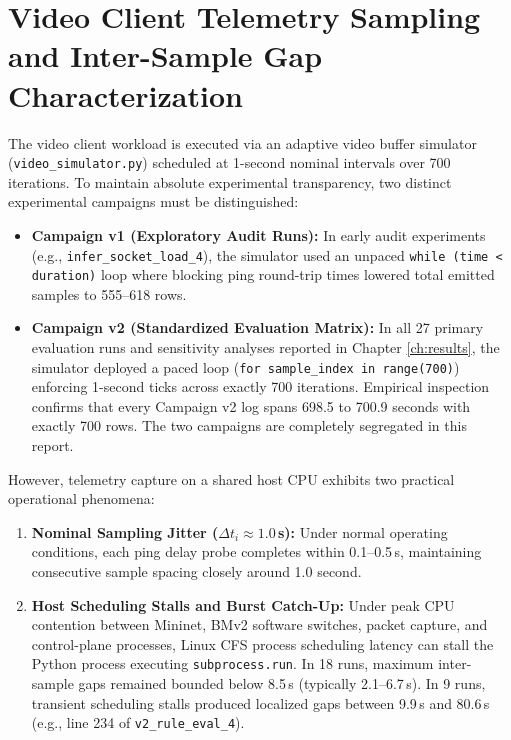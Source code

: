 \documentclass[12pt,a4paper,oneside]{report}
\begin{document}
\section{Video Client Telemetry Sampling and Inter-Sample Gap Characterization}
\label{sec:telemetry_sampling_characterization}
The video client workload is executed via an adaptive video buffer simulator (\texttt{video\_simulator.py}) scheduled at 1-second nominal intervals over 700 iterations. To maintain absolute experimental transparency, two distinct experimental campaigns must be distinguished:
\begin{itemize}
  \item \textbf{Campaign v1 (Exploratory Audit Runs):} In early audit experiments (e.g., \texttt{infer\_socket\_load\_4}), the simulator used an unpaced \texttt{while (time < duration)} loop where blocking ping round-trip times lowered total emitted samples to 555--618 rows.
  \item \textbf{Campaign v2 (Standardized Evaluation Matrix):} In all 27 primary evaluation runs and sensitivity analyses reported in Chapter \ref{ch:results}, the simulator deployed a paced loop (\texttt{for sample\_index in range(700)}) enforcing 1-second ticks across exactly 700 iterations. Empirical inspection confirms that every Campaign v2 log spans 698.5 to 700.9 seconds with exactly 700 rows. The two campaigns are completely segregated in this report.
\end{itemize}

However, telemetry capture on a shared host CPU exhibits two practical operational phenomena:
\begin{enumerate}[label=\arabic*.]
  \item \textbf{Nominal Sampling Jitter ($\Delta t_i \approx 1.0$\,s):} Under normal operating conditions, each ping delay probe completes within 0.1--0.5\,s, maintaining consecutive sample spacing closely around 1.0 second.
  \item \textbf{Host Scheduling Stalls and Burst Catch-Up:} Under peak CPU contention between Mininet, BMv2 software switches, packet capture, and control-plane processes, Linux CFS process scheduling latency can stall the Python process executing \texttt{subprocess.run}. In 18 runs, maximum inter-sample gaps remained bounded below 8.5\,s (typically 2.1--6.7\,s). In 9 runs, transient scheduling stalls produced localized gaps between 9.9\,s and 80.6\,s (e.g., line 234 of \texttt{v2\_rule\_eval\_4}).
\end{enumerate}
\end{document}
